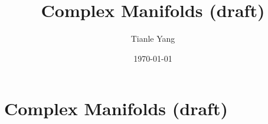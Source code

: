 \documentclass{noteformyself}
\title{Complex Manifolds (draft)}
\author{Tianle Yang}
\date{\today}
\begin{document}
    \maketitle
    \section{Complex Manifolds (draft)}



    

\end{document}
